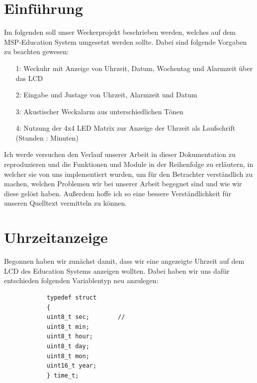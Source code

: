\documentclass[openright,twoside,11pt,a4paper]{scrartcl}
\begin{document}
	\begin{flushleft}
		\section{Einführung}
		Im folgenden soll unser Weckerprojekt beschrieben werden, welches auf dem MSP-Education System umgesetzt werden sollte. Dabei sind folgende Vorgaben zu beachten gewesen:\\
		\begin{itemize}
			\item[1:] Weckuhr mit Anzeige von Uhrzeit, Datum, Wochentag und Alarmzeit über das LCD
			\item[2:] Eingabe und Justage von Uhrzeit, Alarmzeit und Datum
			\item[3:] Akustischer Weckalarm aus unterschiedlichen Tönen
			\item[4:] Nutzung der 4x4 LED Matrix zur Anzeige der Uhrzeit als Laufschrift (Stunden : Minuten)
		\end{itemize}
		Ich werde versuchen den Verlauf unserer Arbeit in dieser Dokumentation zu reproduzieren und die Funktionen und Module in der Reihenfolge zu erläutern, in welcher sie von uns implementiert wurden, um für den Betrachter verständlich zu machen, welchen Problemen wir bei unserer Arbeit begegnet sind und wie wir diese gelöst haben. Außerdem hoffe ich so eine bessere Verständlichkeit für unseren Quelltext vermitteln zu können. 
		\section{Uhrzeitanzeige}
		Begonnen haben wir zunächst damit, dass wir eine angezeigte Uhrzeit auf dem LCD des Education Systems anzeigen wollten. Dabei haben wir uns dafür entschieden folgenden 				Variablentyp neu anzulegen:
		\begin{lstlisting}
			typedef struct
			{
			uint8_t sec;		//
			uint8_t min;
			uint8_t hour;
			uint8_t day;
			uint8_t mon;
			uint16_t year;
			} time_t;
			

\end{lstlisting}
\end{flushleft}
\end{document}
